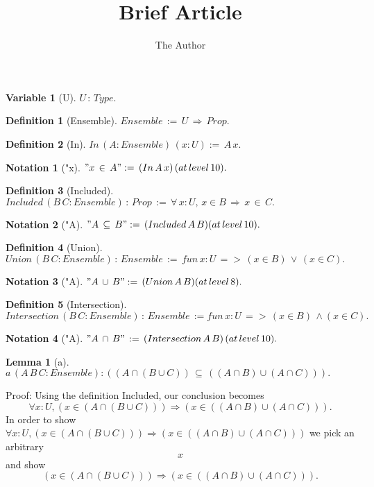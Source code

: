 \documentclass[11pt, oneside]{article}
\title{Brief Article}
\author{The Author}
\date{}							%
\newtheorem{Lemma}{Lemma}
\newtheorem{Definition}{Definition}
\newtheorem{Variable}{Variable}
\newtheorem{Notation}{Notation}
\begin{document}
\maketitle

\begin{Variable}[U] \label{Variable:U}
$U\,:\,Type.$
 \end{Variable}
\begin{Definition}[Ensemble] \label{Definition:Ensemble}
$Ensemble\,:=\,U\,\Rightarrow \,Prop.$
 \end{Definition}
\begin{Definition}[In] \label{Definition:In}
$In\,(A:Ensemble)\,(x:U):=\,A\,x.$
 \end{Definition}
\begin{Notation}["x] \label{Notation:"x}
$"x\,\in \,A":=\,(In\,A\,x)\,(at\,level\,10).$
 \end{Notation}
\begin{Definition}[Included] \label{Definition:Included}
$Included\,(B\,C:Ensemble)\,:\,Prop\,:=\,\forall \,x:U,\,x\in B\,\Rightarrow \,x\,\in \,C.$
 \end{Definition}
\begin{Notation}["A] \label{Notation:"A}
$"A\,\subseteq \,B":=\,(Included\,A\,B)(at\,level\,10).$
 \end{Notation}
\begin{Definition}[Union] \label{Definition:Union}
$Union\,(B\,C:Ensemble)\,:\,Ensemble\,:=\,fun\,x:U\,=>\,(x\in B)\,\lor \,(x\in C).$
 \end{Definition}
\begin{Notation}["A] \label{Notation:"A}
$"A\,\cup \,B":=\,(Union\,A\,B)(at\,level\,8).$
 \end{Notation}
\begin{Definition}[Intersection] \label{Definition:Intersection}
$Intersection\,(B\,C:Ensemble)\,:\,Ensemble\,:=fun\,x:U\,=>\,(x\in B)\,\land (x\in C).$
 \end{Definition}
\begin{Notation}["A] \label{Notation:"A}
$"A\,\cap \,B"\,:=\,(Intersection\,A\,B)\,(at\,level\,10).$
 \end{Notation}
\begin{Lemma}[a] \label{Lemma:a}
$a\,(A\,B\,C:Ensemble):((A\cap (B\cup C))\,\subseteq \,((A\cap B)\cup (A\cap C))).$
 \end{Lemma}


 Proof: Using the definition Included, our conclusion becomes $$\forall x : U, (x \in (A \cap (B \cup C))) \Rightarrow (x \in ((A \cap B) \cup (A \cap C))) .$$In order to show $\forall x : U, (x \in (A \cap (B \cup C))) \Rightarrow (x \in ((A \cap B) \cup (A \cap C))) $ we pick an arbitrary $$x$$ and show $$(x \in (A \cap (B \cup C))) \Rightarrow (x \in ((A \cap B) \cup (A \cap C))) .$$
\end{document}
